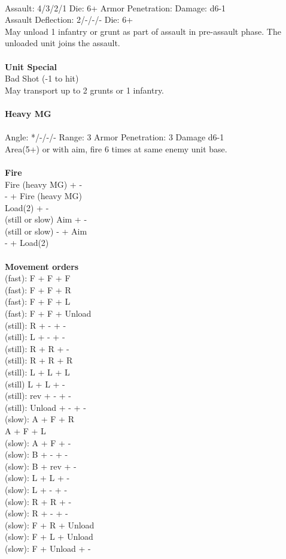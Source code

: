 \ \\
Assault: 4/3/2/1 Die: 6+ Armor Penetration:  Damage: d6-1 \\
Assault Deflection: 2/-/-/- Die: 6+\\
\indent May unload 1 infantry or grunt as part of assault in pre-assault phase. The unloaded unit joins the assault. \\
\ \\

{\bf Unit Special} \\
Bad Shot (-1 to hit) \\ May transport up to 2 grunts or 1 infantry. 
\ \\
\ \\
{\bf Heavy MG } \\
\ \\
Angle: */-/-/- Range: 3 Armor Penetration: 3 Damage d6-1 \\
\indent Area(5+) or with aim, fire 6 times at same enemy unit base. \\





\ \\ {\bf Fire } \\
Fire (heavy MG) + - \\
- + Fire (heavy MG) \\
Load(2) + - \\
(still or slow) Aim + - \\
(still or slow) - + Aim \\
- + Load(2) \\
\ \\ {\bf Movement orders } \\
(fast): F + F + F \\
(fast): F + F + R \\
(fast): F + F + L \\
(fast): F + F + Unload \\
(still): R + - + - \\
(still): L + - + - \\
(still): R + R + - \\
(still): R + R + R \\
(still): L + L + L \\
(still) L + L + - \\
(still): rev + - + - \\
(still): Unload + - + - \\
(slow): A + F + R \\
A + F + L \\
(slow): A + F + - \\
(slow): B + - + - \\
(slow): B + rev + - \\
(slow): L + L + - \\
(slow): L + - + - \\
(slow): R + R + - \\
(slow): R + - + -  \\
(slow): F + R + Unload \\
(slow): F + L + Unload \\
(slow): F + Unload + - \\



